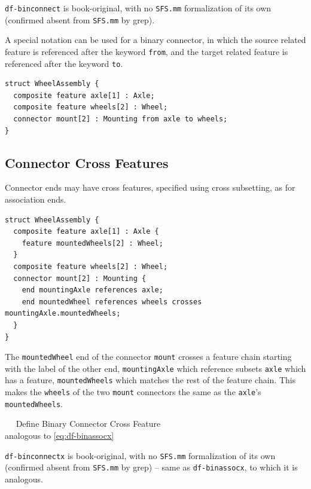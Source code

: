 \pn \texttt{df-binconnect} is book-original, with no \texttt{SFS.mm} formalization of its own
(confirmed absent from \texttt{SFS.mm} by grep).


\pn A special notation can be used for a binary connector, in which the source related feature is referenced after the
keyword \texttt{from}, and the target related feature is referenced after the keyword \texttt{to}.

\begin{lstlisting}
struct WheelAssembly {
  composite feature axle[1] : Axle;
  composite feature wheels[2] : Wheel;
  connector mount[2] : Mounting from axle to wheels;
}
\end{lstlisting}

\subsection{Connector Cross Features}

\pn Connector ends may have cross features, specified using cross subsetting, as for association ends.

\begin{lstlisting}
struct WheelAssembly {
  composite feature axle[1] : Axle {
    feature mountedWheels[2] : Wheel;
  }
  composite feature wheels[2] : Wheel;
  connector mount[2] : Mounting {
    end mountingAxle references axle;
    end mountedWheel references wheels crosses mountingAxle.mountedWheels;
  }
}
\end{lstlisting}

\pn The \texttt{mountedWheel} end of the connector \texttt{mount} crosses a feature chain starting with the label of the other end, \texttt{mountingAxle} which reference subsets \texttt{axle} which has a feature, \texttt{mountedWheels} which matches the rest of the feature chain.  This makes the \texttt{wheels} of the two \texttt{mount} connectors the same as the \texttt{axle}'s \texttt{mountedWheels}.

\begin{definition}~~   Define Binary Connector Cross Feature \\
analogous to \ref{eq:df-binassocx}
\end{definition}

\pn \texttt{df-binconnectx} is book-original, with no \texttt{SFS.mm} formalization of its own
(confirmed absent from \texttt{SFS.mm} by grep) -- same as \texttt{df-binassocx}, to which it is
analogous.


